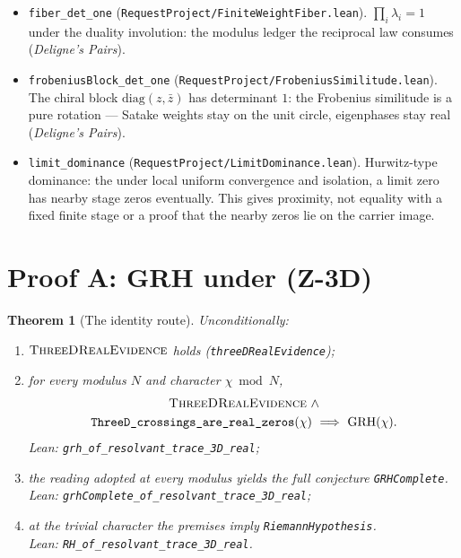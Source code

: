 \documentclass[11pt]{article}
\newtheorem{theorem}{Theorem}
\theoremstyle{definition}
\renewcommand{\Re}{\operatorname{Re}}
\begin{document}
\begin{itemize}
(\texttt{RequestProject/FiniteWeightFiber.lean}). The local numerator is
self-reciprocal: the per-place functional equation whose global assembly has
fixed axis \(\Re s=\tfrac12\) --- the midline the crossings sit on (\emph{Deligne's Pairs}).
\item \texttt{fiber\_det\_one}
(\texttt{RequestProject/FiniteWeightFiber.lean}). \(\prod_i\lambda_i=1\)
under the duality involution: the modulus ledger the reciprocal law
consumes (\emph{Deligne's Pairs}).
\item \texttt{frobeniusBlock\_det\_one}
(\texttt{RequestProject/FrobeniusSimilitude.lean}). The chiral block
\(\mathrm{diag}(z,\bar z)\) has determinant \(1\): the Frobenius similitude
is a pure rotation --- Satake weights stay on the unit circle, eigenphases
stay real (\emph{Deligne's Pairs}).
\item \texttt{limit\_dominance}
(\texttt{RequestProject/LimitDominance.lean}). Hurwitz-type dominance: the
under local uniform convergence and isolation, a limit zero has nearby stage
zeros eventually.  This gives proximity, not equality with a fixed finite
stage or a proof that the nearby zeros lie on the carrier image.
\end{itemize}

\section{Proof A: GRH under (Z-3D)}\label{sec:grh-proofA}

\begin{theorem}[The identity route]\label{thm:grh-routeA}
Unconditionally:
\begin{enumerate}[label=\textup{(\roman*)},leftmargin=*,nosep]
\item \(\textsc{ThreeDRealEvidence}\) holds
(\texttt{threeDRealEvidence});
\item for every modulus \(N\) and character \(\chi\bmod N\),
\[
\begin{gathered}
\textsc{ThreeDRealEvidence}\ \wedge\\
\texttt{ThreeD\_crossings\_are\_real\_zeros}(\chi)
\ \Longrightarrow\ \mathrm{GRH}(\chi).
\end{gathered}
\]
Lean: \texttt{grh\_of\_resolvant\_trace\_3D\_real};
\item the reading adopted at every modulus yields the full conjecture
\texttt{GRHComplete}.\\
Lean: \texttt{grhComplete\_of\_resolvant\_trace\_3D\_real};
\item at the trivial character the premises imply
\texttt{RiemannHypothesis}.\\
Lean: \texttt{RH\_of\_resolvant\_trace\_3D\_real}.
\end{enumerate}
\end{theorem}
\end{document}
